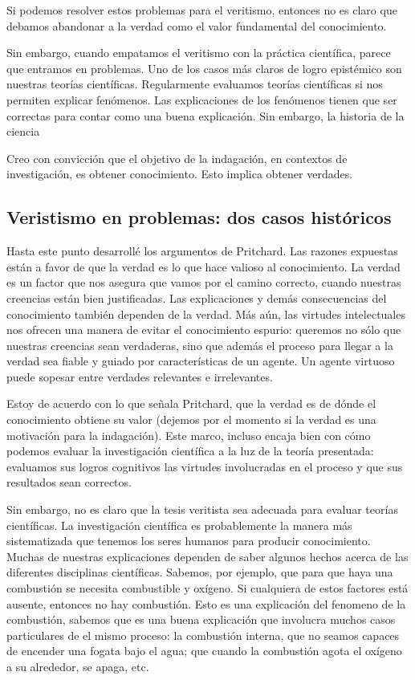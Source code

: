 Si podemos resolver estos problemas para el veritismo, entonces no es claro que debamos abandonar a la verdad como el valor fundamental del conocimiento.

Sin embargo, cuando empatamos el veritismo con la práctica científica, parece que entramos en problemas.
Uno de los casos más claros de logro epistémico son nuestras teorías científicas.
Regularmente evaluamos teorías científicas si nos permiten explicar fenómenos. 
Las explicaciones de los fenómenos tienen que ser correctas para contar como una buena explicación.
Sin embargo, la historia de la ciencia 

Creo con convicción que el objetivo de la indagación, en contextos de investigación, es obtener conocimiento. Esto implica obtener verdades.

\subsection{Veristismo en problemas: dos casos históricos}

Hasta este punto desarrollé los argumentos de Pritchard. 
Las razones expuestas están a favor de que la verdad es lo que hace valioso al conocimiento.
La verdad es un factor que nos asegura que vamos por el camino correcto, cuando nuestras creencias están bien justificadas.
Las explicaciones y demás consecuencias del conocimiento también dependen de la verdad. 
Más aún, las virtudes intelectuales nos ofrecen una manera de evitar el conocimiento espurio: queremos no sólo que nuestras creencias sean verdaderas, sino que además el proceso para llegar a la verdad sea fiable y guiado por características de un agente. 
Un agente virtuoso puede sopesar entre verdades relevantes e irrelevantes.

Estoy de acuerdo con lo que señala Pritchard, que la verdad es de dónde el conocimiento obtiene su valor (dejemos por el momento si la verdad es una motivación para la indagación). 
Este marco, incluso encaja bien con cómo podemos evaluar la investigación científica a la luz de la teoría presentada: evaluamos sus logros cognitivos las virtudes involucradas en el proceso y que sus resultados sean correctos. 

Sin embargo, no es claro que la tesis veritista sea adecuada para evaluar teorías científicas. 
La investigación científica es probablemente la manera más sistematizada que tenemos los seres humanos para producir conocimiento.
Muchas de nuestras explicaciones dependen de saber algunos hechos acerca de las diferentes disciplinas científicas. 
Sabemos, por ejemplo, que para que haya una combustión se necesita combustible y oxígeno.
Si cualquiera de estos factores está ausente, entonces no hay combustión.
Esto es una explicación del fenomeno de la combustión, sabemos que es una buena explicación que involucra muchos casos particulares de el mismo proceso: la combustión interna, que no seamos capaces de encender una fogata bajo el agua; que cuando la combustión agota el oxígeno a su alrededor, se apaga, etc.

